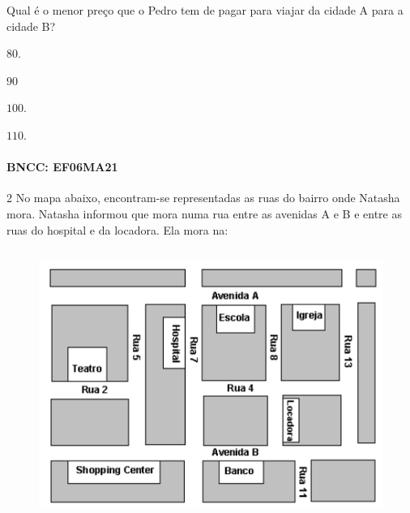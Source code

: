 {\noindent Qual é o menor preço que o Pedro tem de pagar para viajar da cidade A
para a cidade B?

\begin{escolha}
\item $80$.
\item $90$
\item $100$.
\item $110$.
\end{escolha}

\paragraph{BNCC: EF06MA21 }


\num{2}  No mapa abaixo, encontram-se representadas as ruas do bairro onde
Natasha mora. Natasha informou que mora numa rua entre as avenidas A e B e entre as
ruas do hospital e da locadora. Ela mora na:

\begin{figure}
\includegraphics[width=4.76042in,height=3.42708in]{./imgSAEB_6_MAT/media/image75.png}
\end{figure}

}
